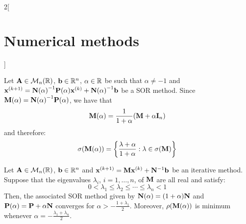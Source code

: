 \documentclass[../../../main.tex]{subfiles}
\begin{document}
\begin{multicols}{2}[\section{Numerical methods}]
\begin{method}
\end{method}
\begin{definition}
    Let $\vb{A}\in\mathcal{M}_n(\mathbb{R})$, $\vb{b}\in\mathbb{R}^n$, $\alpha\in\mathbb{R}$ be such that $\alpha\ne-1$ and $\vb{x}^{(k+1)}={\vb{N}(\alpha)}^{-1}\vb{P}(\alpha)\vb{x}^{(k)}+{\vb{N}(\alpha)}^{-1}\vb{b}$ be a SOR method. Since $\vb{M}(\alpha)={\vb{N}(\alpha)}^{-1}\vb{P}(\alpha)$, we have that $$\vb{M}(\alpha)=\frac{1}{1+\alpha}(\vb{M}+\alpha\vb{I}_n)$$ and therefore: $$\sigma(\vb{M}(\alpha))=\left\{\frac{\lambda+\alpha}{1+\alpha}:\lambda\in\sigma(\vb{M})\right\}$$  
\end{definition}
\begin{theorem}
    Let $\vb{A}\in\mathcal{M}_n(\mathbb{R})$, $\vb{b}\in\mathbb{R}^n$ and $\vb{x}^{(k+1)}=\vb{M}\vb{x}^{(k)}+\vb{N}^{-1}\vb{b}$ be an iterative method. Suppose that the eigenvalues $\lambda_i$, $i=1,\ldots,n$, of $\vb{M}$ are all real and satisfy: $$0<\lambda_1\leq\lambda_2\leq\cdots\leq\lambda_n<1$$
    Then, the associated SOR method given by $\vb{N}(\alpha)=(1+\alpha)\vb{N}$ and $\vb{P}(\alpha)=\vb{P}+\alpha\vb{N}$ converges for $\alpha>-\frac{1+\lambda_1}{2}$. Moreover, $\rho(\vb{M}(\alpha))$ is minimum whenever $\alpha=-\frac{\lambda_1+\lambda_n}{2}$.
\end{theorem}

\end{multicols}
\end{document}
